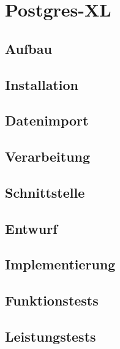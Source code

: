 \chapter{Postgres-XL}

\section{Aufbau}

\section{Installation}

\section{Datenimport}

\section{Verarbeitung}

\section{Schnittstelle}

\section{Entwurf}

\section{Implementierung}

\section{Funktionstests}

\section{Leistungstests}